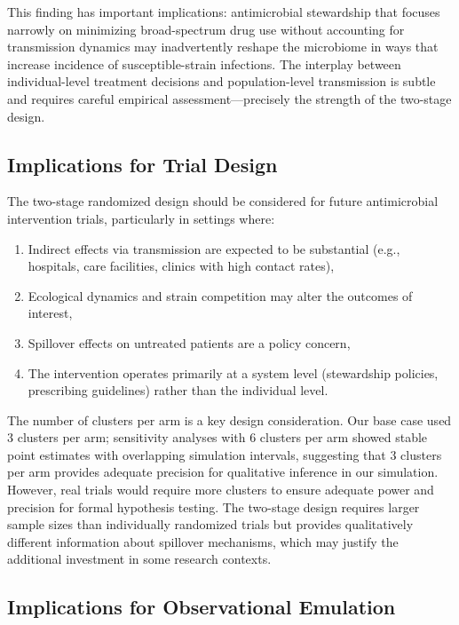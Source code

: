 \documentclass[preprint,11pt]{elsarticle}
\begin{document}
This finding has important implications: antimicrobial stewardship that focuses narrowly on minimizing broad-spectrum drug use without accounting for transmission dynamics may inadvertently reshape the microbiome in ways that increase incidence of susceptible-strain infections. The interplay between individual-level treatment decisions and population-level transmission is subtle and requires careful empirical assessment---precisely the strength of the two-stage design.

\subsection{Implications for Trial Design}

The two-stage randomized design should be considered for future antimicrobial intervention trials, particularly in settings where:
\begin{enumerate}
  \item Indirect effects via transmission are expected to be substantial (e.g., hospitals, care facilities, clinics with high contact rates),
  \item Ecological dynamics and strain competition may alter the outcomes of interest,
  \item Spillover effects on untreated patients are a policy concern,
  \item The intervention operates primarily at a system level (stewardship policies, prescribing guidelines) rather than the individual level.
\end{enumerate}

The number of clusters per arm is a key design consideration. Our base case used 3 clusters per arm; sensitivity analyses with 6 clusters per arm showed stable point estimates with overlapping simulation intervals, suggesting that 3 clusters per arm provides adequate precision for qualitative inference in our simulation. However, real trials would require more clusters to ensure adequate power and precision for formal hypothesis testing. The two-stage design requires larger sample sizes than individually randomized trials but provides qualitatively different information about spillover mechanisms, which may justify the additional investment in some research contexts.

\subsection{Implications for Observational Emulation}
\end{document}

